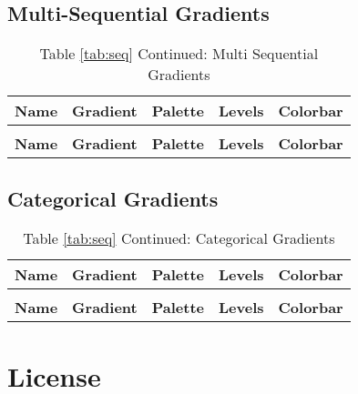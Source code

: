 \documentclass[a4paper]{article}
\begin{document}
\subsection{Multi-Sequential Gradients}
\renewcommand{\arraystretch}{2}
\begin{longtable}{p{}p{}p{}p{}p{}}
	\caption{Multi-Sequential Gradients} \label{tab:msq}                                       \\
	\hline
	\textbf{Name} & \textbf{Gradient} & \textbf{Palette} & \textbf{Levels} & \textbf{Colorbar} \\ \hline \endfirsthead
	\caption*{Table \ref{tab:seq} Continued: Multi Sequential Gradients}                       \\
	\hline
	\textbf{Name} & \textbf{Gradient} & \textbf{Palette} & \textbf{Levels} & \textbf{Colorbar} \\ \hline \endhead
	
\end{longtable}
\newpage
\subsection{Categorical Gradients}
\renewcommand{\arraystretch}{2}
\begin{longtable}{p{}p{}p{}p{}p{}}
	\caption{Categorical Gradients} \label{tab:cat}                                            \\
	\hline
	\textbf{Name} & \textbf{Gradient} & \textbf{Palette} & \textbf{Levels} & \textbf{Colorbar} \\ \hline \endfirsthead
	\caption*{Table \ref{tab:seq} Continued: Categorical Gradients}                            \\
	\hline
	\textbf{Name} & \textbf{Gradient} & \textbf{Palette} & \textbf{Levels} & \textbf{Colorbar} \\ \hline \endhead
	
\end{longtable}
\newpage
\section{License}

\newpage


\end{document}
